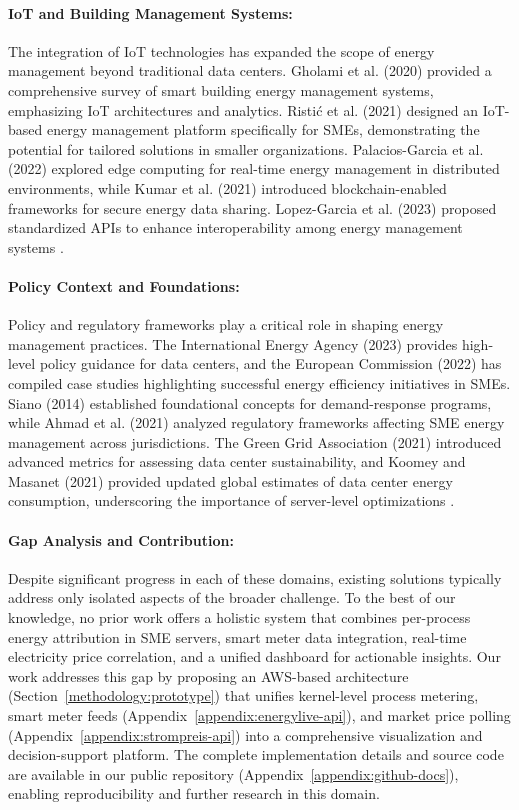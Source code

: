 \paragraph{\textbf{IoT and Building Management Systems:}}
The integration of IoT technologies has expanded the scope of energy management beyond traditional data centers. Gholami et al. (2020) provided a comprehensive survey of smart building energy management systems, emphasizing IoT architectures and analytics. Ristić et al. (2021) designed an IoT-based energy management platform specifically for SMEs, demonstrating the potential for tailored solutions in smaller organizations. Palacios-Garcia et al. (2022) explored edge computing for real-time energy management in distributed environments, while Kumar et al. (2021) introduced blockchain-enabled frameworks for secure energy data sharing. Lopez-Garcia et al. (2023) proposed standardized APIs to enhance interoperability among energy management systems \cite{gholami2020energymanagement,ristic2021iotenergymanagement,palacios2022edge,kumar2021blockchain,lopez2023standardized}.
\paragraph{\textbf{Policy Context and Foundations:}}
Policy and regulatory frameworks play a critical role in shaping energy management practices. The International Energy Agency (2023) provides high-level policy guidance for data centers, and the European Commission (2022) has compiled case studies highlighting successful energy efficiency initiatives in SMEs. Siano (2014) established foundational concepts for demand-response programs, while Ahmad et al. (2021) analyzed regulatory frameworks affecting SME energy management across jurisdictions. The Green Grid Association (2021) introduced advanced metrics for assessing data center sustainability, and Koomey and Masanet (2021) provided updated global estimates of data center energy consumption, underscoring the importance of server-level optimizations \cite{iea2023datacenters,ec2022energyefficiencysmes,siano2014demandresponse,ahmad2021regulatory,greengrid2021beyond,koomey2021does}.
\paragraph{\textbf{Gap Analysis and Contribution:}}
Despite significant progress in each of these domains, existing solutions typically address only isolated aspects of the broader challenge. To the best of our knowledge, no prior work offers a holistic system that combines per-process energy attribution in SME servers, smart meter data integration, real-time electricity price correlation, and a unified dashboard for actionable insights. Our work addresses this gap by proposing an AWS-based architecture (Section~\ref{methodology:prototype}) that unifies kernel-level process metering, smart meter feeds (Appendix~\ref{appendix:energylive-api}), and market price polling (Appendix~\ref{appendix:strompreis-api}) into a comprehensive visualization and decision-support platform. The complete implementation details and source code are available in our public repository (Appendix~\ref{appendix:github-docs}), enabling reproducibility and further research in this domain.